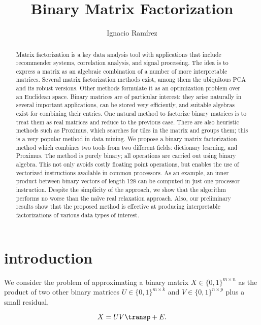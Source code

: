 \documentclass[a4paper]{IEEEtran}
\title{Binary Matrix Factorization}\author{Ignacio Ram\'{i}rez}
\begin{document}
\maketitle
\begin{abstract}
Matrix factorization is a key data analysis tool with applications that  include recommender systems, correlation analysis, and signal processing. The idea is to express a matrix as an algebraic combination of a number of more interpretable matrices. Several matrix factorization methods exist, among them the ubiquitous PCA and its robust versions. Other methods formulate it as an optimization problem over an Euclidean space. Binary matrices are of particular interest: they arise naturally in several important applications,  can be stored very efficiently, and suitable algebras exist for combining their entries.
One natural method to factorize binary matrices is to treat them as real matrices and reduce to the previous case. There are also heuristic methods such as Proximus, which searches for tiles in the matrix and groups them; this is a very popular method in data mining.
We propose a binary matrix factorization method which combines two tools from two different fields: dictionary learning, and Proximus. The method is purely binary; all operations are carried out using binary algebra. This not only avoids costly floating point operations,  but enables the use of vectorized instructions available in common processors. As an example, an inner product between binary vectors of length 128 can be computed in just one processor instruction.
Despite the simplicity of the approach, we show that the algorithm performs no worse than the na\"ive real relaxation approach. Also, our preliminary results show that the proposed method is effective at producing interpretable factorizations of various data types of interest.
\end{abstract}

\section{introduction}

We consider the problem of approximating a binary matrix $X \in \{0,1\}^{m{\times}n}$ as the product of two other binary matrices $U \in \{0,1\}^{m{\times}k}$ and $V \in \{0,1\}^{n{\times}p}$ plus a small residual,

\begin{equation}
X = UV\transp + E.
\label{eq:mf}
\end{equation}
\end{document}
